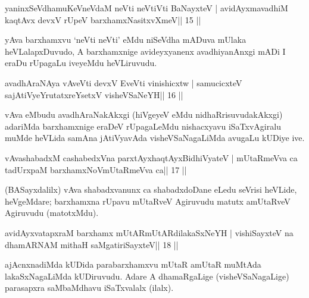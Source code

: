 

\begin{shl}
yaninxSeVdhamuKeVneVdaM neVti neVtiVti BaNayxteV |
avidAyxmavadhiM kaqtAvx devxV rUpeV barxhamxNasitxvXmeV\hfill || 15 ||
\end{shl}

\begin{artha}
yAva barxhamxvu `neVti neVti' eMdu niSeVdha mADuva mUlaka heVLalapxDuvudo, A barxhamxnige avideyxyanenx avadhiyanAnxgi mADi I eraDu rUpagaLu iveyeMdu heVLiruvudu.
\end{artha}



\begin{shl}
avadhAraNAya vAveVti devxV EveVti vinishicxtw |
samucicxteV sajAtiVyeYrutatxreYsetxV visheVSaNeYH\hfill || 16 ||
\end{shl}

\begin{artha}
vAva eMbudu avadhAraNakAkxgi (hiVgeyeV eMdu nidhaRrisuvudakAkxgi) adariMda barxhamxnige eraDeV rUpagaLeMdu nishacxyavu iSaTxvAgiralu muMde heVLida samAna jAtiVyavAda visheVSaNagaLiMda avugaLu kUDiye ive.
\end{artha}

\begin{shl}
vAvashabadxM cashabedxVna parxtAyxhaqtAyxBidhiVyateV |
mUtaRmeVva ca tadUrxpaM barxhamxNoV\s mUtaRmeVva ca\hfill || 17 ||
\end{shl}

\begin{artha}
(BASayxdalilx) vAva shabadxvanunx ca shabadxdoDane eLedu seVrisi   heVLide, heVgeMdare; barxhamxna rUpavu mUtaRveV Agiruvudu matutx amUtaRveV Agiruvudu (matotxMdu).
\end{artha}

\begin{shl}
avidAyxvatapxraM barxhamx mUtARmUtARdilakaSxNeYH |
vishiSayxteV na dhamARNAM mithaH saMgatiriSayxteV\hfill || 18 ||
\end{shl}

\begin{artha}
ajAcnxnadiMda kUDida parabarxhamxvu mUtaR amUtaR muMtAda
lakaSxNagaLiMda kUDiruvudu. Adare A dhamaRgaLige (visheVSaNagaLige)
parasapxra saMbaMdhavu iSaTxvalalx (ilalx). 
\end{artha}



